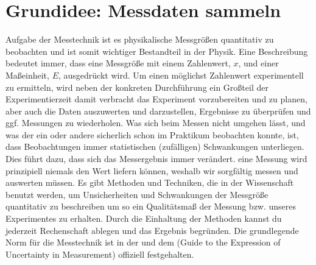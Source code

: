 \documentclass[letterpaper,10pt,english]{jupyterBook}
\begin{document}
\section{Grundidee: Messdaten sammeln}
\label{\detokenize{content/0_Praktikum:grundidee-messdaten-sammeln}}
\sphinxAtStartPar
Aufgabe der Messtechnik ist es physikalische Messgrößen quantitativ zu beobachten und ist somit wichtiger Bestandteil in der Physik. Eine  Beschreibung bedeutet immer, dass eine Messgröße mit einem Zahlenwert, \(x\), und einer Maßeinheit, \(E\), ausgedrückt wird. Um einen möglichst  Zahlenwert experimentell zu ermitteln, wird neben der konkreten Durchführung ein Großteil der Experimentierzeit damit verbracht das Experiment vorzubereiten und zu planen, aber auch die Daten auszuwerten und darzustellen, Ergebnisse zu überprüfen und ggf. Messungen zu wiederholen.
Was sich beim Messen nicht umgehen lässt, und was der ein oder andere sicherlich schon im Praktikum beobachten konnte, ist, dass Beobachtungen immer statistischen (zufälligen) Schwankungen unterliegen. Dies führt dazu, dass sich das Messergebnis immer verändert. eine Messung wird prinzipiell niemals den  Wert liefern können, weshalb wir sorgfältig messen und auswerten müssen. Es gibt  Methoden und Techniken, die in der Wissenschaft benutzt werden, um Unsicherheiten und Schwankungen der Messgröße quantitativ zu beschreiben um so ein Qualitätsmaß der Messung bzw. unseres Experimentes zu erhalten. Durch die Einhaltung der  Methoden kannst du jederzeit Rechenschaft ablegen und das Ergebnis begründen. Die grundlegende Norm für die Messtechnik ist in der  und dem  (Guide to the Expression of Uncertainty in Measurement) offiziell festgehalten.
\end{document}
